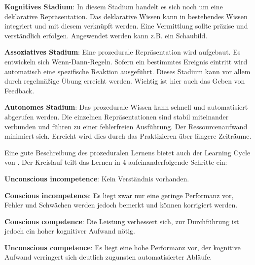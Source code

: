 \documentclass[doc,a4paper,12pt]{apa6}
\begin{document}
\begin{compactenum}
  \item \textbf{Kognitives Stadium}: In diesem Stadium handelt es sich noch um eine deklarative Repräsentation. Das deklarative Wissen kann in bestehendes Wissen integriert und mit diesem verknüpft werden. Eine Vermittlung sollte präzise und verständlich erfolgen. Angewendet werden kann z.B. ein Schaubild.
  \item \textbf{Assoziatives Stadium}: Eine prozedurale Repräsentation wird aufgebaut. Es entwickeln sich Wenn-Dann-Regeln. Sofern ein bestimmtes Ereignis eintritt wird automatisch eine spezifische Reaktion ausgeführt. Dieses Stadium kann vor allem durch regelmäßige Übung erreicht werden. Wichtig ist hier auch das Geben von Feedback.
  \item \textbf{Autonomes Stadium}: Das prozedurale Wissen kann schnell und automatisiert abgerufen werden. Die einzelnen Repräsentationen sind stabil miteinander verbunden und führen zu einer fehlerfreien Ausführung. Der Ressourcenaufwand minimiert sich. Erreicht wird dies durch das Praktizieren über längere Zeiträume.
\end{compactenum}

Eine gute Beschreibung des prozeduralen Lernens bietet auch der Learning Cycle von \textcite{whitmore2009coaching}. Der Kreislauf teilt das Lernen in 4 aufeinanderfolgende Schritte ein:

\begin{compactenum}
  \item \textbf{Unconscious incompetence}: Kein Verständnis vorhanden.
  \item \textbf{Conscious incompetence}: Es liegt zwar nur eine geringe Performanz vor, Fehler und Schwächen werden jedoch bemerkt und können korrigiert werden.
  \item \textbf{Conscious competence}: Die Leistung verbessert sich, zur Durchführung ist jedoch ein hoher kognitiver Aufwand nötig.
  \item \textbf{Unconscious competence}: Es liegt eine hohe Performanz vor, der kognitive Aufwand verringert sich deutlich zugunsten automatisierter Abläufe.
\end{compactenum}
\end{document}
